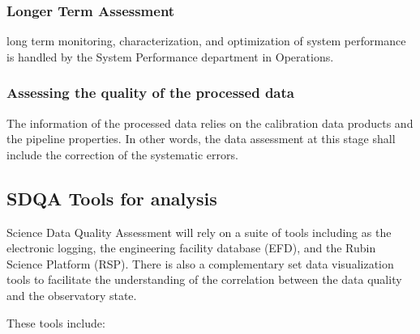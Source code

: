 \subsubsection{Longer Term Assessment}

long term monitoring, characterization, and optimization of system performance is handled by the System Performance department in Operations.

\subsubsection{Assessing the quality of the processed data}

The information of the processed data relies on the calibration data products and the pipeline properties. In other words, the data assessment at this stage shall include the correction of the systematic errors.

\subsection{SDQA Tools for analysis}

Science Data Quality Assessment will rely on a suite of tools including as the electronic logging, the engineering facility database (EFD), and the Rubin Science Platform (RSP).  There is also a complementary set data visualization tools to facilitate the understanding of the correlation between the data quality and the observatory state.

These tools include:

